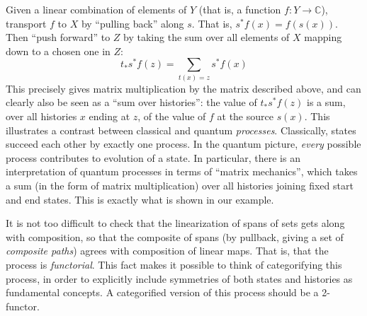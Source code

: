 \documentclass[10pt]{amsart}
\numberwithin{theorem}{subsection}
\begin{document}
Given a linear combination of elements of $Y$ (that is, a function $f
: Y \rightarrow \mathbb{C}$), transport $f$ to $X$ by ``pulling
back'' along $s$.  That is, $s^{\ast}f(x) = f(s(x))$.  Then ``push
forward'' to $Z$ by taking the sum over all elements of $X$ mapping
down to a chosen one in $Z$:
\begin{equation}
t_{\ast} s^{\ast} f (z) = \sum_{t(x) = z} s^{\ast}f (x)
\end{equation}
This precisely gives matrix multiplication by the matrix described
above, and can clearly also be seen as a ``sum over histories'': the
value of $t_{\ast} s^{\ast} f(z)$ is a sum, over all histories $x$
ending at $z$, of the value of $f$ at the source $s(x)$.  This
illustrates a contrast between classical and quantum
\textit{processes}.  Classically, states succeed each other by exactly
one process.  In the quantum picture, \textit{every} possible process
contributes to evolution of a state.  In particular, there is an
interpretation of quantum processes in terms of ``matrix mechanics'',
which takes a sum (in the form of matrix multiplication) over all
histories joining fixed start and end states.  This is exactly what is
shown in our example.

It is not too difficult to check that the linearization of spans of
sets gets along with composition, so that the composite of spans (by
pullback, giving a set of \textit{composite paths}) agrees with
composition of linear maps.  That is, that the process is
\textit{functorial}.  This fact makes it possible to think of
categorifying this process, in order to explicitly include symmetries
of both states and histories as fundamental concepts.  A categorified
version of this process should be a 2-functor.
\end{document}
